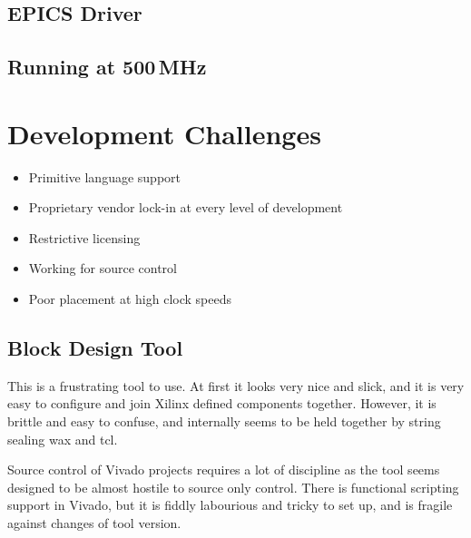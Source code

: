 \documentclass[
    a4paper,
    keeplastbox,            %
    hyphens,                %
    nospread,               %
]{jacow}
\begin{document}
\subsection{EPICS Driver}

\subsection{Running at 500\,MHz}


\section{Development Challenges}

\begin{itemize}
\item
    Primitive language support
\item
    Proprietary vendor lock-in at every level of development
\item
    Restrictive licensing
\item
    Working for source control
\item
    Poor placement at high clock speeds
\end{itemize}

\subsection{Block Design Tool}

This is a frustrating tool to use.  At first it looks very nice and slick, and
it is very easy to configure and join Xilinx defined components together.
However, it is brittle and easy to confuse, and internally seems to be held
together by string sealing wax and tcl.

Source control of Vivado projects requires a lot of discipline as the tool seems
designed to be almost hostile to source only control.  There is functional
scripting support in Vivado, but it is fiddly labourious and tricky to set up,
and is fragile against changes of tool version.
\end{document}
